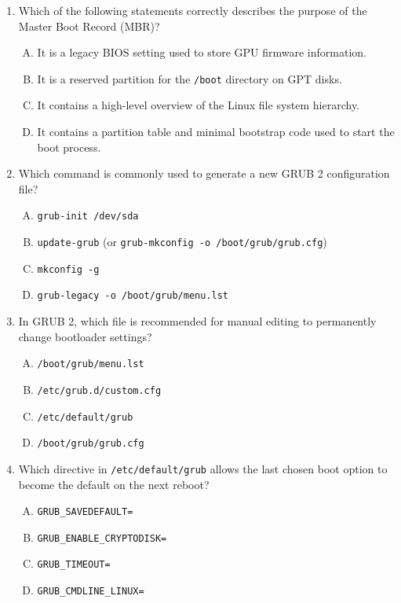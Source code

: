 \documentclass[a4paper]{report}
\begin{document}
\begin{enumerate}[1.]

    \item Which of the following statements correctly describes the purpose of the Master Boot Record (MBR)?  
    \begin{enumerate}[A)]
        \item It is a legacy BIOS setting used to store GPU firmware information.  
        \item It is a reserved partition for the \texttt{/boot} directory on GPT disks.  
        \item It contains a high-level overview of the Linux file system hierarchy.  
        \item It contains a partition table and minimal bootstrap code used to start the boot process.  
    \end{enumerate}

    \item Which command is commonly used to generate a new GRUB 2 configuration file?  
    \begin{enumerate}[A)]
        \item \texttt{grub-init /dev/sda}  
        \item \texttt{update-grub} (or \texttt{grub-mkconfig -o /boot/grub/grub.cfg})  
        \item \texttt{mkconfig -g}  
        \item \texttt{grub-legacy -o /boot/grub/menu.lst}  
    \end{enumerate}

    \item In GRUB 2, which file is recommended for manual editing to permanently change bootloader settings?  
    \begin{enumerate}[A)]
        \item \texttt{/boot/grub/menu.lst}  
        \item \texttt{/etc/grub.d/custom.cfg}  
        \item \texttt{/etc/default/grub}  
        \item \texttt{/boot/grub/grub.cfg}  
    \end{enumerate}

    \item Which directive in \texttt{/etc/default/grub} allows the last chosen boot option to become the default on the next reboot?  
    \begin{enumerate}[A)]
        \item \texttt{GRUB\_SAVEDEFAULT=}  
        \item \texttt{GRUB\_ENABLE\_CRYPTODISK=}  
        \item \texttt{GRUB\_TIMEOUT=}  
        \item \texttt{GRUB\_CMDLINE\_LINUX=}  
    \end{enumerate}


\end{enumerate}
\end{document}
